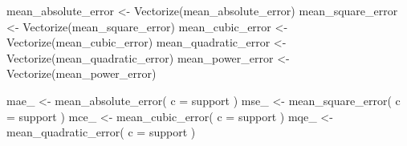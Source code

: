 \documentclass[
  letterpaper,
  DIV=11,
  numbers=noendperiod]{scrreprt}
\newenvironment{Shaded}{\begin{snugshade}}{\end{snugshade}}
\newcommand{\AttributeTok}[1]{\textcolor[rgb]{0.40,0.45,0.13}{#1}}
\newcommand{\FunctionTok}[1]{\textcolor[rgb]{0.28,0.35,0.67}{#1}}
\newcommand{\NormalTok}[1]{\textcolor[rgb]{0.00,0.23,0.31}{#1}}
\newcommand{\OtherTok}[1]{\textcolor[rgb]{0.00,0.23,0.31}{#1}}
\begin{document}
\begin{Shaded}
\begin{Highlighting}[]
\NormalTok{mean\_absolute\_error  }\OtherTok{\textless{}{-}} \FunctionTok{Vectorize}\NormalTok{(mean\_absolute\_error)}
\NormalTok{mean\_square\_error    }\OtherTok{\textless{}{-}} \FunctionTok{Vectorize}\NormalTok{(mean\_square\_error)}
\NormalTok{mean\_cubic\_error     }\OtherTok{\textless{}{-}} \FunctionTok{Vectorize}\NormalTok{(mean\_cubic\_error)}
\NormalTok{mean\_quadratic\_error }\OtherTok{\textless{}{-}} \FunctionTok{Vectorize}\NormalTok{(mean\_quadratic\_error)}
\NormalTok{mean\_power\_error     }\OtherTok{\textless{}{-}} \FunctionTok{Vectorize}\NormalTok{(mean\_power\_error)}
\end{Highlighting}
\end{Shaded}

\begin{Shaded}
\begin{Highlighting}[]
\NormalTok{mae\_ }\OtherTok{\textless{}{-}} \FunctionTok{mean\_absolute\_error}\NormalTok{(}
  \AttributeTok{c =}\NormalTok{ support}
\NormalTok{)}
\NormalTok{mse\_ }\OtherTok{\textless{}{-}} \FunctionTok{mean\_square\_error}\NormalTok{(}
  \AttributeTok{c =}\NormalTok{ support}
\NormalTok{  )}
\NormalTok{mce\_ }\OtherTok{\textless{}{-}} \FunctionTok{mean\_cubic\_error}\NormalTok{(}
  \AttributeTok{c =}\NormalTok{ support}
\NormalTok{)}
\NormalTok{mqe\_ }\OtherTok{\textless{}{-}} \FunctionTok{mean\_quadratic\_error}\NormalTok{(}
  \AttributeTok{c =}\NormalTok{ support}
\NormalTok{)}
\end{Highlighting}
\end{Shaded}
\end{document}
